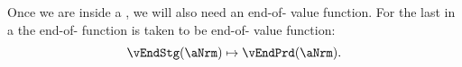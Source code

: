 Once we are inside a {\stg}, we will also need an end-of-{\stg} value function.  For the last {\stg} in a {\interval} the end-of-{\stg} function is taken to be end-of-{\interval} value function:
  \begin{equation}\begin{gathered}\begin{aligned}
        \vEndStg(\aNrm) \mapsto \vEndPrd(\aNrm).
      \end{aligned}\end{gathered}\end{equation}



  


